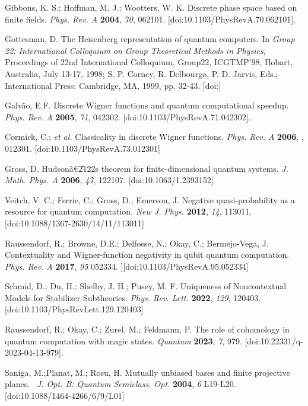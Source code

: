 \documentclass{article}
\begin{document}
\begin{thebibliography}{99}
 Gibbons, K. S.; Hoffman, M. J.; Wootters, W. K. Discrete
phase space based on finite fields. \textit{Phys. Rev. A} \textbf{2004}, 
\textit{70}, 062101. [doi:10.1103/PhysRevA.70.062101].

 Gottesman, D. The Heisenberg representation of quantum
computers. In \textit{Group 22: International Colloquium on Group
Theoretical Methods in Physics}, Proceedings of 22nd International
Colloquium, Group22, ICGTMP'98, Hobart, Australia, July 13-17, 1998; S. P.
Corney, R. Delbourgo, P. D. Jarvis, Eds.; International Press: Cambridge,
MA, 1999, pp. 32-43. [doi:]

 Galv\~ao, E.F. Discrete Wigner functions and quantum
computational speedup. \textit{Phys. Rev. A} \textbf{2005}, \textit{71},
042302. [doi:10.1103/PhysRevA.71.042302].

 Cormick, C.; \textit{et al.} Classicality in discrete
Wigner functions. \textit{Phys. Rev. A} \textbf{2006}, , 012301.
[doi:10.1103/PhysRevA.73.012301]

 Gross, D. Hudson\^{a}\euro \U{2122}s theorem for
finite-dimensional quantum systems. \textit{J. Math. Phys. A} \textbf{2006}, 
\textit{47}, 122107. [doi:10.1063/1.2393152]

 Veitch, V. C.; Ferrie, C.; Gross, D.; Emerson,
J. Negative quasi-probability as a resource for quantum computation. \textit{%
New J. Phys.} \textbf{2012}, \textit{14}, 113011.
[doi:10.1088/1367-2630/14/11/113011]

 Raussendorf, R.; Browne, D.E.; Delfosse, N.; Okay, C.;
Bermejo-Vega, J. Contextuality and Wigner-function negativity in qubit
quantum computation. \textit{Phys. Rev. A} \textbf{2017}, \textit{95}
052334. ][doi:10.1103/PhysRevA.95.052334]

 Schmid, D.; Du, H.; Shelby, J. H.; Pusey, M. F.
Uniqueness of Noncontextual Models for Stabilizer Subtheories. \textit{Phys.
Rev. Lett.} \textbf{2022}, \textit{129}, 120403.
[doi:10.1103/PhysRevLett.129.120403]

 Raussendorf, R.; Okay, C.; Zurel, M.; Feldmann, P. The role
of cohomology in quantum computation with magic states. \textit{Quantum} 
\textbf{2023}, \textit{7}, 979. [doi:10.22331/q-2023-04-13-979].

 Saniga, M.;Planat, M.; Rosu, H. Mutually unbiased bases
and finite projective planes. \textit{\ J. Opt. B: Quantum Semiclass. Opt.} 
\textbf{2004}, \textit{6} L19-L20. [doi:10.1088/1464-4266/6/9/L01]


\end{thebibliography}
\end{document}

